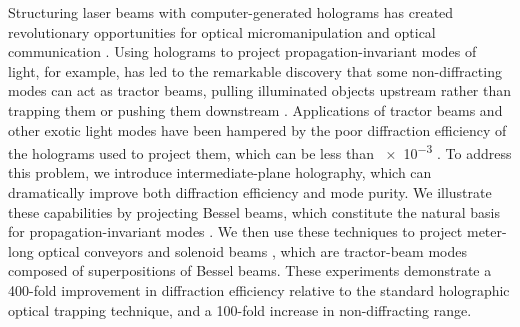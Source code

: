 Structuring laser beams with computer-generated holograms
has created revolutionary opportunities for
optical micromanipulation \cite{grier03} and
optical communication \cite{gibson04,bozinovic13,willner15}.
Using holograms to project propagation-invariant modes of light,
for example, has led to the remarkable
discovery that some non-diffracting modes
can act as tractor beams, pulling illuminated objects
upstream rather than trapping them or pushing them downstream
\cite{marston06,lee10}.
Applications of tractor beams and other exotic light modes have
been hampered by the poor diffraction efficiency of the
holograms used to project them, which can be less
than \num{e-3} \cite{ruffner12a,ruffner14}.
To address this problem, we introduce intermediate-plane
holography, which can dramatically improve
both diffraction efficiency and mode purity.
We illustrate these capabilities by projecting
Bessel beams, which constitute 
the natural basis for propagation-invariant modes \cite{durnin87,durnin87a}.
We then use these techniques to project meter-long
optical conveyors \cite{cizmar05,ruffner12a,ruffner14}
and solenoid beams \cite{lee10,yevick16}, 
which are tractor-beam modes composed of superpositions of Bessel
beams.
These experiments demonstrate a \num{400}-fold improvement in 
diffraction efficiency relative to the standard holographic optical
trapping technique, and a
\num{100}-fold increase in non-diffracting range.

